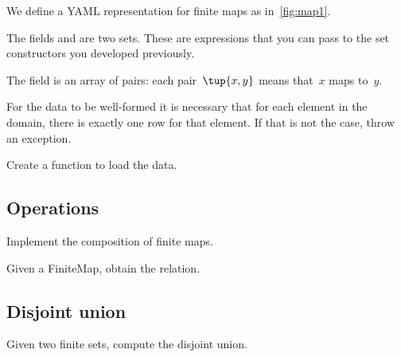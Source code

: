 

We define a YAML representation for finite maps as in~\cref{fig:map1}.

The fields  and  are two sets. These are expressions that you can pass to the set constructors you developed previously.

The field  is an array of pairs: each pair~$\tup{x, y}$ means that~$x$ maps to~$y$.

For the data to be well-formed it is necessary that for each element in the domain, there is exactly one row for that element.
If that is not the case, throw an exception.



\begin{gradedexercise}[Representation]
  Create a function to load the data.


%

\end{gradedexercise}

\subsection{Operations}


\begin{gradedexercise}[Composition]
  Implement the composition of finite maps.


%

\end{gradedexercise}


\begin{gradedexercise}
  Given a FiniteMap, obtain the relation.


%

\end{gradedexercise}
\subsection{Disjoint union}
\begin{gradedexercise}
  Given two finite sets, compute the disjoint union.

\end{gradedexercise}

